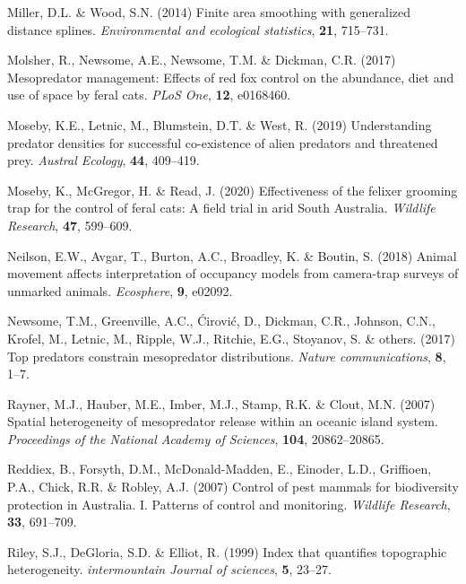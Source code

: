 \documentclass[]{elsarticle} %
\begin{document}
\leavevmode\hypertarget{ref-miller2014finite}{}%
Miller, D.L. \& Wood, S.N. (2014) Finite area smoothing with generalized distance splines. \emph{Environmental and ecological statistics}, \textbf{21}, 715--731.

\leavevmode\hypertarget{ref-molsher2017mesopredator}{}%
Molsher, R., Newsome, A.E., Newsome, T.M. \& Dickman, C.R. (2017) Mesopredator management: Effects of red fox control on the abundance, diet and use of space by feral cats. \emph{PLoS One}, \textbf{12}, e0168460.

\leavevmode\hypertarget{ref-moseby2019understanding}{}%
Moseby, K.E., Letnic, M., Blumstein, D.T. \& West, R. (2019) Understanding predator densities for successful co-existence of alien predators and threatened prey. \emph{Austral Ecology}, \textbf{44}, 409--419.

\leavevmode\hypertarget{ref-moseby2020effectiveness}{}%
Moseby, K., McGregor, H. \& Read, J. (2020) Effectiveness of the felixer grooming trap for the control of feral cats: A field trial in arid South Australia. \emph{Wildlife Research}, \textbf{47}, 599--609.

\leavevmode\hypertarget{ref-neilson2018animal}{}%
Neilson, E.W., Avgar, T., Burton, A.C., Broadley, K. \& Boutin, S. (2018) Animal movement affects interpretation of occupancy models from camera-trap surveys of unmarked animals. \emph{Ecosphere}, \textbf{9}, e02092.

\leavevmode\hypertarget{ref-newsome2017top}{}%
Newsome, T.M., Greenville, A.C., Ćirović, D., Dickman, C.R., Johnson, C.N., Krofel, M., Letnic, M., Ripple, W.J., Ritchie, E.G., Stoyanov, S. \& others. (2017) Top predators constrain mesopredator distributions. \emph{Nature communications}, \textbf{8}, 1--7.

\leavevmode\hypertarget{ref-rayner2007spatial}{}%
Rayner, M.J., Hauber, M.E., Imber, M.J., Stamp, R.K. \& Clout, M.N. (2007) Spatial heterogeneity of mesopredator release within an oceanic island system. \emph{Proceedings of the National Academy of Sciences}, \textbf{104}, 20862--20865.

\leavevmode\hypertarget{ref-reddiex2007control}{}%
Reddiex, B., Forsyth, D.M., McDonald-Madden, E., Einoder, L.D., Griffioen, P.A., Chick, R.R. \& Robley, A.J. (2007) Control of pest mammals for biodiversity protection in Australia. I. Patterns of control and monitoring. \emph{Wildlife Research}, \textbf{33}, 691--709.

\leavevmode\hypertarget{ref-riley1999index}{}%
Riley, S.J., DeGloria, S.D. \& Elliot, R. (1999) Index that quantifies topographic heterogeneity. \emph{intermountain Journal of sciences}, \textbf{5}, 23--27.
\end{document}
